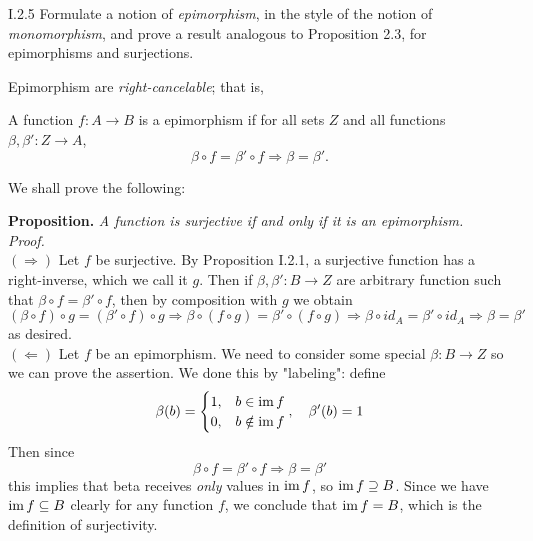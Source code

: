 \begin{problem}{I.2.5}
Formulate a notion of \emph{epimorphism}, in the style of the notion of \emph{monomorphism}, and prove a result analogous to Proposition 2.3, for epimorphisms and surjections.
\end{problem}
\begin{solution}
Epimorphism are \emph{right-cancelable}; that is,
\begin{center}
A function $f : A \to B$ is a epimorphism if for all sets $Z$ and all functions $\beta, \beta' : Z \to A$, 
\[
\beta \circ f = \beta' \circ f \Longrightarrow \beta = \beta'.
\]
\end{center}
We shall prove the following:

\noindent \textbf{Proposition. }\textit{A function is surjective if and only if it is an epimorphism.} \\
\textit{Proof. } \\
$(\Rightarrow)$ Let $f$ be surjective. By Proposition I.2.1, a surjective function has a right-inverse, which we call it $g$. Then if $\beta, \beta' : B \to Z$ are arbitrary function such that $\beta \circ f = \beta' \circ f$, then by composition with $g$ we obtain
\[
(\beta \circ f) \circ g=  (\beta' \circ f) \circ g \Rightarrow \beta \circ (f \circ g)=  \beta' \circ  (f \circ g) \Rightarrow \beta \circ id_A = \beta' \circ id_A \Rightarrow \beta = \beta'
\]
as desired. \\
$(\Leftarrow)$ Let $f$ be an epimorphism. We need to consider some special $\beta:B \to Z$ so we can prove the assertion. We done this by "labeling": define
\[
\beta(b) = \begin{cases}
    1, &b \in \operatorname{im} f \\
    0, &b \notin \operatorname{im} f
\end{cases}, \quad \beta'(b) = 1
\]
Then since 
\[
\beta \circ f = \beta' \circ f  \Rightarrow \beta = \beta'
\] 
this implies that beta receives \emph{only} values in $\operatorname{im} f$, so $\operatorname{im} f \supseteq B$. Since we have $\operatorname{im} f \subseteq B$ clearly for any function $f$, we conclude that $\operatorname{im} f = B$, which is the definition of surjectivity.
\end{solution}

